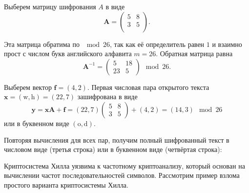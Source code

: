 Выберем матрицу шифрования $A$ в виде
\[
    \mathbf{A} = \left( \begin{array}{cc}
        5 & 8 \\
        3 & 5 \\
    \end{array} \right).
\]

Эта матрица обратима по $\mod 26$, так как её определитель равен $1$ и взаимно прост с числом букв английского алфавита $m=26$. Обратная матрица равна
\[
    \mathbf{A}^{-1} = \left( \begin{array}{cc}
        5  & 18 \\
        23 & 5
    \end{array} \right) \mod 26.
\]

Выберем вектор $\mathbf{f} = (4, 2)$. Первая числовая пара открытого текста $\mathbf{x} = (\text{w}, \text{h}) = (22, 7)$ зашифрована в виде
\[
    \mathbf{y} = \mathbf{x} \mathbf{A} + \mathbf{f} =
        (22, 7)
        \left( \begin{array}{cc}
            5 & 8 \\
            3 & 5
        \end{array} \right) +
        (4, 2) = (14, 3) \mod 26
\]
или в буквенном виде $(\text{o}, \text{d})$.

Повторяя вычисления для всех пар, получим полный шифрованный текст в числовом виде (третья строка) или в буквенном виде (четвёртая строка):
\begin{center}  \end{center}
\exampleend

Криптосистема Хилла уязвима к частотному криптоанализу, который основан на вычислении частот последовательностей символов. Рассмотрим пример взлома простого варианта криптосистемы Хилла.

